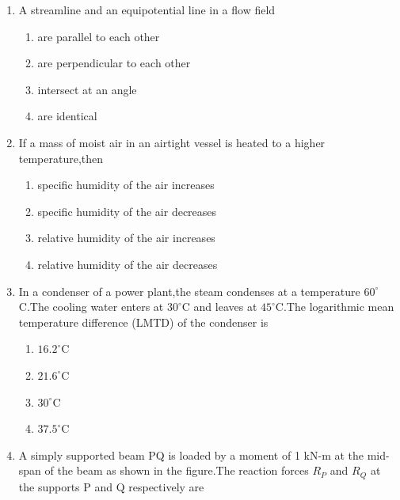 \documentclass[journal,12pt,onecolumn]{IEEEtran}
\theoremstyle{remark}
\begin{document}
    \begin{enumerate}
        \item A streamline and an equipotential line in a flow field
    \begin{multicols}{2}
    \begin{enumerate}
        \item are parallel to each other
        \item are perpendicular to each other
        \item intersect at an angle
        \item are identical
    \end{enumerate}
    \end{multicols}
     \item If a mass of moist air in an airtight vessel is heated to a higher temperature,then
         \begin{multicols}{2}
    \begin{enumerate}
        \item specific humidity of the air increases
        \item specific humidity of the air decreases
        \item relative humidity of the air increases
        \item relative humidity of the air decreases
    \end{enumerate}
        \end{multicols}
    \item In a condenser of a power plant,the steam condenses at a temperature $60^{\circ}$C.The cooling water enters at $30^{\circ}$C and leaves at $45^{\circ}$C.The logarithmic mean temperature difference (LMTD) of the condenser is
        \begin{multicols}{2}
    \begin{enumerate}
        \item $16.2^{\circ}$C
        \item $21.6^{\circ}$C
        \item $30^{\circ}$C
        \item $37.5^{\circ}$C        
        \end{enumerate}
            \end{multicols}
        \item A simply supported beam PQ is loaded by a moment of 1 kN-m at the mid-span of the beam as shown in the figure.The reaction forces $R_{P}$ and $R_{Q}$ at the supports P and Q respectively are
      \begin{figure}[H]

\end{figure}
\end{enumerate}
\end{document}
